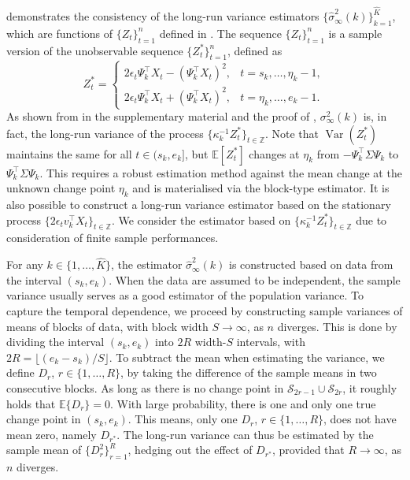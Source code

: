 \documentclass[11pt]{article}
\DeclareMathOperator*{\var}{Var}
\theoremstyle{plain}
\theoremstyle{definition}
\begin{document}
 demonstrates the consistency of the long-run variance estimators $\{\widehat{\sigma}_{\infty}^2(k)\}_{k = 1}^{\widehat{K}}$, which are functions of $\{Z_t\}_{t = 1}^n$ defined in .  The sequence $\{Z_t\}_{t = 1}^n$ is a sample version of the unobservable sequence $\{Z_t^*\}_{t = 1}^n$, defined as
\[
    Z_t^* = \begin{cases}
        2\epsilon_t\Psi_k^{\top}X_t - (\Psi_k^{\top}X_t)^2, & t = s_k, \ldots, \eta_k-1,\\
        2\epsilon_t\Psi_k^{\top}X_t + (\Psi_k^{\top}X_t)^2, & t = \eta_k, \ldots, e_k-1.
    \end{cases}
\]
As shown from  in the supplementary material and the proof of , $\sigma_{\infty}^2(k)$ is, in fact, the long-run variance of the process $\{\kappa_k^{-1}Z_t^*\}_{t \in \mathbb{Z}}$. Note that $\var(Z_t^*)$ maintains the same for all $t \in (s_k,e_k]$, but $\mathbb{E}[Z_t^*]$ changes at $\eta_k$ from $-\Psi_k^{\top}\Sigma \Psi_k$ to $\Psi_k^{\top}\Sigma \Psi_k$.  This requires a robust estimation method against the mean change at the unknown change point $\eta_k$ and is materialised via the block-type estimator.  It is also possible to construct a long-run variance estimator based on the stationary process $\{2\epsilon_tv_k^{\top}X_t\}_{t \in \mathbb{Z}}$. We consider the estimator based on $\{\kappa_k^{-1}Z_t^*\}_{t \in \mathbb{Z}}$ due to consideration of finite sample performances.

For any $k \in \{1, \ldots, \widehat{K}\}$, the estimator $\widehat{\sigma}_{\infty}^2(k)$ is constructed based on data from the interval $(s_k, e_k)$.  When the data are assumed to be independent, the sample variance usually serves as a good estimator of the population variance.  To capture the temporal dependence, we proceed by constructing sample variances of means of blocks of data, with block width $S \to \infty$, as $n$ diverges.  This is done by dividing the interval $(s_k, e_k)$ into $2R$ width-$S$ intervals, with $2R = \lfloor (e_k-s_k)/S \rfloor$.  To subtract the mean when estimating the variance, we define $D_r$, $r \in \{1, \ldots, R\}$, by taking the difference of the sample means in two consecutive blocks.  As long as there is no change point in $\mathcal{S}_{2r-1} \cup \mathcal{S}_{2r}$, it roughly holds that $\mathbb{E}\{D_r\} = 0$.  With large probability, there is one and only one true change point in $(s_k, e_k)$.  This means, only one $D_r$, $r \in \{1, \ldots, R\}$, does not have mean zero, namely $D_{r^*}$.  The long-run variance can thus be estimated by the sample mean of $\{D_r^2\}_{r = 1}^R$, hedging out the effect of $D_{r^*}$, provided that $R \to \infty$, as $n$ diverges.
\end{document}
